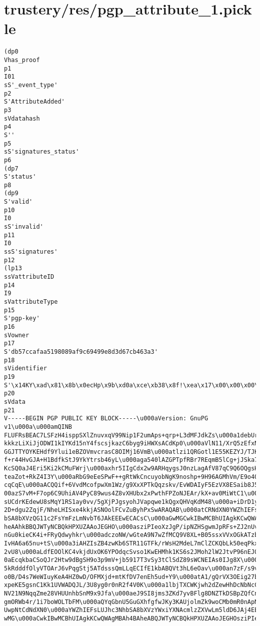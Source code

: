 \documentclass[12pt]{report}
\begin{document}
	\section{trustery/res/pgp\_attribute\_1.pickle}
	\begin{lstlisting}
(dp0
Vhas_proof
p1
I01
sS'_event_type'
p2
S'AttributeAdded'
p3
sVdatahash
p4
S''
p5
sS'signatures_status'
p6
(dp7
S'status'
p8
(dp9
S'valid'
p10
I0
sS'invalid'
p11
I0
ssS'signatures'
p12
(lp13
ssVattributeID
p14
I9
sVattributeType
p15
S'pgp-key'
p16
sVowner
p17
S'db57ccafaa5198089af9c69499e8d3d67cb463a3'
p18
sVidentifier
p19
S'\x14KY\xad\x81\x8b\x0ecHp\x9b\xd0a\xce\xb38\x8f!\xea\x17\x00\x00\x00\x00\x00\x00\x00\x00\x00\x00\x00\x00'
p20
sVdata
p21
V-----BEGIN PGP PUBLIC KEY BLOCK-----\u000aVersion: GnuPG v1\u000a\u000amQINB
FLUFRsBEAC7LSFzH4isppSXlZnuvxqV99Nip1F2umAps+qrp+L3dMFJdkZs\u000a1debUrH0tfNcTF
kkkzLiXiJjODWI1kIYKd15nY4fscsjkazC6byg9iHWXsACdKp0\u000aVlN11/XrQ5zEfxNp8kU0mJT
GGJTTYOYKEHdf9Ylui1eBZOVmvcrasC8OIMj16VmB\u000atlzi1QRGotl1E55KEZYJ/TJK4SDB5B+f
f+r44HvGJA+H1BdfkStJ9YkYtrsb46yL\u000aga540lAZGPTpfRBr7REqmB5lCg+jJSka7oRUkNsTp
KcSQ0aJ4Eri5Ki2kCMuFWrj\u000axhr5IIgCdx2w9ARHqygsJ0nzLagAfV87qC9Q6OQgsHG6jiC8oS
teaZot+RkZ4I3Y\u000aRbG9eEeSPwF++gRtWkCncuyobNgK9noshp+9H96AGMhVm/E9o40TT24JSEr
cqCqE\u000aACQQif+6VvdMcofpwXm1Wz/g9XxXPTkQqzskv/EvWDAIyF5EzVX8ESaib8J5zJUj\u0
00azS7vM+F7op6C9UhiAV4PyC89wus4Z8vXHUbx2xPwthFPZoNJEAr/kX+av0MiWtC1\u000a96VUUt
sUCdrKEdewU8sMqY1RS1ay0vv/5gXjPJgsyohJVapqwe1kQgxQHVqKdM48\u000a+iDrD1ytv4odI8D
2D+dgu2ZqjF/NheLHISxe4kkjASNOolFCvZuByhPxSwARAQAB\u000atCRNdXN0YWZhIEFsLUJhc3Nh
bSA8bXVzQG11c2FsYmFzLmNvbT6JAkEEEwECACsC\u000aGwMGCwkIBwMCBhUIAgkKCwQWAgMBAh4BA
heAAhkBBQJWTyNCBQkHPXUZAAoJEGHO\u000asziPIeoXzJgP/ipNZHSgwmJpRFs+ZJ2nUvC6CQG5fI
nGu0kieCK4i+FRyQdwyhkr\u000adczoNW/wGteA9N7wZfMCQ9V8XL+B05ssxVVxOGkATzbq+ziUA5n
IvHA6a65nu+tS\u000a3iAHZIsZB4zwKb6STR11GTFk/rWsH2MdeL7mClZCKQbLk50eqPkxJ9vJx06i
2vU8\u000aLdfEOOlKC4vkjdUxOK6YPOdqcSvso1KwEHMhk1KS6s2JMoh2lW2JtvP96nEJQZYI\u00
0aEcqkbaCSoQJr2Htw9dBgSH9o3p9mV+jb5917T3vSy3tClSdZ89sWCNEIAs0IJg8X\u000afjP6CyO
5kRdddfOlyVTOArJ6vPqgStj5ATdsssQmLLqECIfE1kbABQVt3hL6eOav\u000an7zF/s9viiL5V7aX
o0B/D4s7WeWIuyKeA4HZ0wD/OFMXjd+mtKfDV7enEh5ud+Y9\u000atA1/gQrVX3OEig27bgGD6NfOx
xpeKE5gsnC1Kk1UVWADQJL/3U8yg0r0nR2f4V0K\u000a1lbjTXCWKjwh2dZewHhDcNbNcCGlwQHniD
NV21N9NqqZme28VHUUnhbSnM9x9Jfa\u000aeJ9SI8jms3ZKd7yvBFlg8DNZTkDSBpZQfCn6WmriWZg
gmORWb4r/1i7boWOLTbFM\u000aQYqGbnU5GuGXhfgfwJKy3KAUjolmZk9woCMb0mR0nApNP2FqJOx1
UwpNtCdNdXN0\u000aYWZhIEFsLUJhc3NhbSA8bXVzYWxiYXNAcmlzZXVwLm5ldD6JAj4EEwECACgCG
wMG\u000aCwkIBwMCBhUIAgkKCwQWAgMBAh4BAheABQJWTyNCBQkHPXUZAAoJEGHOsziPIeoX\u000

\end{lstlisting}
\end{document}
